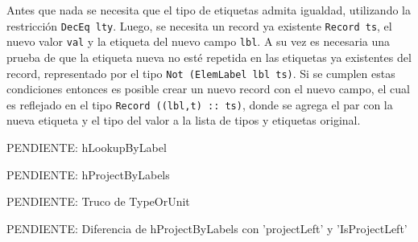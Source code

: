 Antes que nada se necesita que el tipo de etiquetas admita igualdad, utilizando la restricción \texttt{DecEq lty}. Luego, se necesita un record ya existente \texttt{Record ts}, el nuevo valor \texttt{val} y la etiqueta del nuevo campo \texttt{lbl}. A su vez es necesaria una prueba de que la etiqueta nueva no esté repetida en las etiquetas ya existentes del record, representado por el tipo \texttt{Not (ElemLabel lbl ts)}. Si se cumplen estas condiciones entonces es posible crear un nuevo record con el nuevo campo, el cual es reflejado en el tipo \texttt{Record ((lbl,t) :: ts)}, donde se agrega el par con la nueva etiqueta y el tipo del valor a la lista de tipos y etiquetas original.

PENDIENTE: hLookupByLabel

PENDIENTE: hProjectByLabels

PENDIENTE: Truco de TypeOrUnit

PENDIENTE: Diferencia de hProjectByLabels con 'projectLeft' y 'IsProjectLeft'
